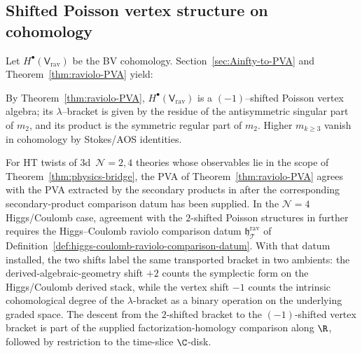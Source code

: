 \subsection{Shifted Poisson vertex structure on cohomology}
\label{subsec:PVA-cohomology-expanded}
Let $H^\bullet(\mathsf V_{\mathrm{rav}})$ be the BV cohomology. Section~\ref{sec:Ainfty-to-PVA} and Theorem~\ref{thm:raviolo-PVA} yield:

\begin{theorem}
\label{thm:raviolo-PVA-expanded}
By Theorem~\ref{thm:raviolo-PVA},
$H^\bullet(\mathsf V_{\mathrm{rav}})$ is a $(-1)$–shifted Poisson vertex algebra; its $\lambda$–bracket is given by the residue of the antisymmetric singular part of $m_2$, and its product is the symmetric regular part of $m_2$. Higher $m_{k\ge3}$ vanish in cohomology by Stokes/AOS identities.
\end{theorem}

\begin{corollary}
\label{cor:agreement-HT}
For HT twists of \(3\)d~\(\mathcal N=2,4\) theories whose observables
lie in the scope of Theorem~\ref{thm:physics-bridge}, the PVA of
Theorem~\ref{thm:raviolo-PVA} agrees with the PVA extracted by the
secondary products in \cite{OY20,CDG20} after the corresponding
secondary-product comparison datum has been supplied.  In the
\(\mathcal N=4\) Higgs/Coulomb case, agreement with the
\(2\)-shifted Poisson structures in \cite{GW23,GRW21} further requires
the Higgs--Coulomb raviolo comparison datum
\(\mathfrak h_{\mathcal T}^{\mathrm{rav}}\) of
Definition~\ref{def:higgs-coulomb-raviolo-comparison-datum}.  With
that datum installed, the two shifts label the same transported
bracket in two ambients: the derived-algebraic-geometry shift \(+2\)
counts the symplectic form on the Higgs/Coulomb derived stack, while
the vertex shift \(-1\) counts the intrinsic cohomological degree of
the \(\lambda\)-bracket as a binary operation on the underlying graded
space.  The descent from the \(2\)-shifted bracket to the
\((-1)\)-shifted vertex bracket is part of the supplied
factorization-homology comparison along \(\R\), followed by restriction
to the time-slice \(\C\)-disk.
\end{corollary}

